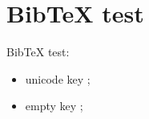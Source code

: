 \documentclass{article}
\begin{document}
\section{BibTeX test}

BibTeX test:

\begin{itemize}
    \item unicode key \cite{dieudonné1969treatise};
    \item empty key \cite{};
\end{itemize}

\printbibliography
\end{document}
